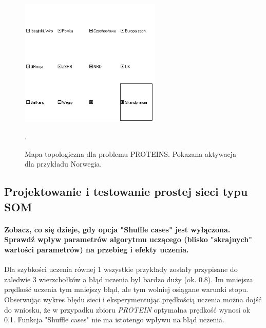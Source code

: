 \begin{figure}[h]
\begin{centering}
\includegraphics[width=0.6\textwidth]{dane/part3/zad2/norwegia}
\caption{Mapa topologiczna dla problemu PROTEINS. Pokazana aktywacja dla przykładu Norwegia.\label{fig:norwegia}}.
\end{centering}
\end{figure}

\subsection{Projektowanie i testowanie prostej sieci typu SOM}
 \paragraph{\textbf{Zobacz, co się dzieje, gdy opcja "Shuffle cases" jest wyłączona. Sprawdź wpływ parametrów algorytmu uczącego (blisko "skrajnych" wartości parametrów) na przebieg i efekty uczenia.}}
 Dla szybkości uczenia równej 1 wszystkie przykłady zostały przypisane do zaledwie 3 wierzchołków a błąd uczenia był bardzo duży (ok. 0.8). Im mniejsza prędkość uczenia tym mniejszy błąd, ale tym wolniej osiągane warunki stopu. Obserwując wykres błędu sieci i eksperymentując prędkością uczenia można dojść do wniosku, że w przypadku zbioru \emph{PROTEIN} optymalna prędkość wynosi ok 0.1.
Funkcja "Shuffle cases" nie ma istotengo wpływu na błąd uczenia.
